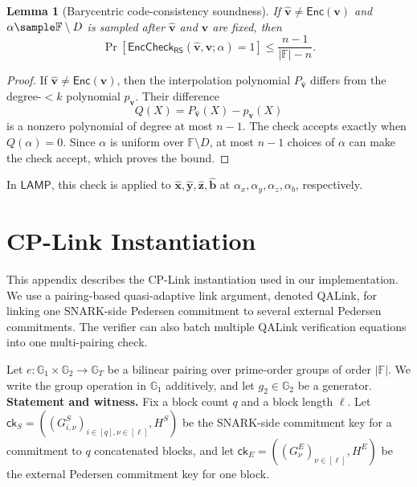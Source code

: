 \documentclass[conference,compsoc]{IEEEtran}
\newcommand{\ck}{\textsf{ck}}
\newcommand{\vect}{\mathbf}         %
\renewcommand{\enc}{\mathsf{Enc}}   %
\renewcommand{\ck}{{\textsf{ck}}}
\newcommand{\protocol}{\textsf{LAMP}}   %
\theoremstyle{plain}
\newtheorem{lemma}[theorem]{Lemma}
\theoremstyle{definition}
\theoremstyle{remark}
\begin{document}
\begin{lemma}[Barycentric code-consistency soundness]
\label{lem:rs-barycentric-soundness}
If \(\widehat{\vect{v}}\neq\enc(\vect{v})\) and
\(\alpha\sample\mathbb{F}\setminus D\) is sampled after
\(\widehat{\vect{v}}\) and \(\vect{v}\) are fixed, then
\[
  \Pr[
    \mathsf{EncCheck}_{\mathsf{RS}}
    (\widehat{\vect{v}},\vect{v};\alpha)=1
  ]
  \le
  \frac{n-1}{|\mathbb{F}|-n}.
\]
\end{lemma}

\begin{proof}
If \(\widehat{\vect{v}}\neq\enc(\vect{v})\), then the interpolation polynomial
\(P_{\widehat{\vect{v}}}\) differs from the degree-\(<k\) polynomial
\(p_{\vect{v}}\).  Their difference
\[
  Q(X)=P_{\widehat{\vect{v}}}(X)-p_{\vect{v}}(X)
\]
is a nonzero polynomial of degree at most \(n-1\).  The check accepts exactly
when \(Q(\alpha)=0\).  Since \(\alpha\) is uniform over
\(\mathbb{F}\setminus D\), at most \(n-1\) choices of \(\alpha\) can make the
check accept, which proves the bound.
\end{proof}

In \(\protocol\), this check is applied to
\(\widehat{\vect{x}},\widehat{\vect{y}},\widehat{\vect{z}},\widehat{\vect{b}}\)
at \(\alpha_x,\alpha_y,\alpha_z,\alpha_b\), respectively.

\section{CP-Link Instantiation}
\label{app:cplink-instant}

This appendix describes the CP-Link instantiation used in our implementation.
We use a pairing-based quasi-adaptive link argument, denoted QALink, for
linking one SNARK-side Pedersen commitment to several external Pedersen
commitments.  The verifier can also batch multiple QALink verification
equations into one multi-pairing check.

Let \(e:\mathbb{G}_1\times\mathbb{G}_2\to\mathbb{G}_T\) be a bilinear pairing
over prime-order groups of order \(|\mathbb{F}|\).  We write the group
operation in \(\mathbb{G}_1\) additively, and let \(g_2\in\mathbb{G}_2\) be a
generator. \\

\noindent\textbf{Statement and witness.}
Fix a block count \(q\) and a block length \(\ell\).  Let
\(\ck_S=((G^S_{i,\nu})_{i\in[q],\nu\in[\ell]},H^S)\) be the SNARK-side
commitment key for a commitment to \(q\) concatenated blocks, and let
\(\ck_E=((G^E_{\nu})_{\nu\in[\ell]},H^E)\) be the external Pedersen commitment
key for one block.
\end{document}
